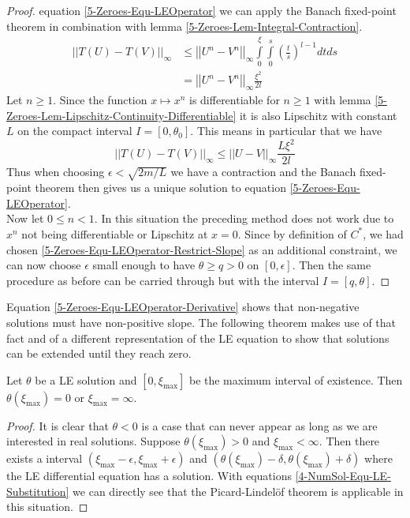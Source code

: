 \begin{proof}
	equation \eqref{5-Zeroes-Equ-LEOperator} we can apply the Banach fixed-point theorem \cite{banachOperationsDansEnsembles1922} in combination with lemma \ref{5-Zeroes-Lem-Integral-Contraction}.
	\begin{align}
		||T(U)-T(V)||_\infty	&\leq	\left|\left|U^n-V^n\right|\right|_\infty\int\limits_0^\xi\int\limits_0^s \left(\frac{t}{s}\right)^{l-1}dtds\\
								&=		\left|\left|U^n-V^n\right|\right|_\infty\frac{\xi^2}{2l}
	\end{align}
	Let $n\geq1$. 
	Since the function $x\mapsto x^n$ is differentiable for $n\geq1$ with lemma \ref{5-Zeroes-Lem-Lipschitz-Continuity-Differentiable} it is also Lipschitz with constant $L$ on the compact interval $I=[0,\theta_0]$.
	This means in particular that we have
	\begin{equation}
		||T(U)-T(V)||_\infty	\leq	\left|\left|U-V\right|\right|_\infty\frac{L\xi^2}{2l}
	\end{equation}
	Thus when choosing $\epsilon<\sqrt{2m/L}$ we have a contraction and the Banach fixed-point theorem then gives us a unique solution to equation \eqref{5-Zeroes-Equ-LEOperator}.\\
	Now let $0\leq n<1$.
	In this situation the preceding method does not work due to $x^n$ not being differentiable or Lipschitz at $x=0$. 
	Since by definition of $C^*$, we had chosen \eqref{5-Zeroes-Equ-LEOperator-Restrict-Slope} as an additional constraint, we can now choose $\epsilon$ small enough to have $\theta\geq q>0$ on $[0,\epsilon]$.
	Then the same procedure as before can be carried through but with the interval $I=[q,\theta]$.
\end{proof}\noindent
Equation \eqref{5-Zeroes-Equ-LEOperator-Derivative} shows that non-negative solutions must have non-positive slope.
The following theorem makes use of that fact and of a different representation of the \ac{LE} equation to show that solutions can be extended until they reach zero.
\begin{lemma}
	Let $\theta$ be a \ac{LE} solution and $[0,\xi_\mathrm{max}]$ be the maximum interval of existence.
	Then $\theta(\xi_\mathrm{max})=0$ or $\xi_\mathrm{max}=\infty$.
\end{lemma}
\begin{proof}
	It is clear that $\theta<0$ is a case that can never appear as long as we are interested in real solutions.
	Suppose $\theta(\xi_\mathrm{max})>0$ and $\xi_\mathrm{max}<\infty$.
	Then there exists a interval $(\xi_\mathrm{max}-\epsilon,\xi_\mathrm{max}+\epsilon)$ and $(\theta(\xi_\mathrm{max})-\delta,\theta(\xi_\mathrm{max})+\delta)$ where the \ac{LE} differential equation has a solution.
	With equations \ref{4-NumSol-Equ-LE-Substitution} we can directly see that the Picard-Lindelöf theorem is applicable in this situation.
\end{proof}
%
%
%
